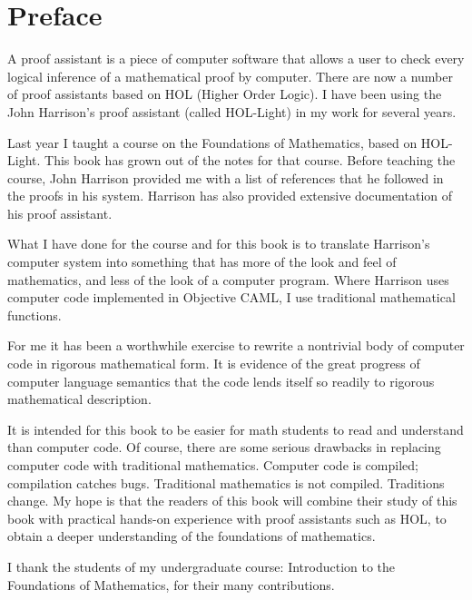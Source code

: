 

   \newpage

   \setcounter{chapter}{-1}
   \chapter{Preface}
   \label{XX}  %

  A proof assistant is a piece of computer software that allows a user to check every logical inference of a mathematical proof by computer.  There are now a number of proof assistants based on HOL (Higher Order Logic).  I have been using the John Harrison's proof assistant (called HOL-Light) in my work for several years.

  Last year I taught a course on the Foundations of Mathematics, based on HOL-Light.  This book has grown out of the notes for that course.  Before teaching the course, John Harrison provided me with a list of references that he followed in the proofs in his system.  Harrison has also provided extensive documentation of his proof assistant.  

What I have done for the course and for this book is to translate Harrison's computer system into something that has more of the look and feel of mathematics, and less of the look of a computer program.  Where Harrison uses computer code implemented in Objective CAML, I use traditional mathematical functions.  

For me it has been a worthwhile exercise to rewrite a nontrivial body of computer code in rigorous mathematical form.  It is evidence of the great progress of computer language semantics that the code lends itself so readily to rigorous mathematical description.

It is intended for this book to be easier for math students to read and understand than computer code.  Of course, there are some serious drawbacks in replacing computer code with traditional mathematics.  Computer code is compiled; compilation catches bugs.  Traditional mathematics is not compiled.  Traditions change.  My hope is that the readers of this book will combine their study of this book with practical hands-on experience with proof assistants such as HOL, to obtain a deeper understanding of the foundations of mathematics.

   I thank the students of my undergraduate course: Introduction to the Foundations of Mathematics, for their many contributions.






